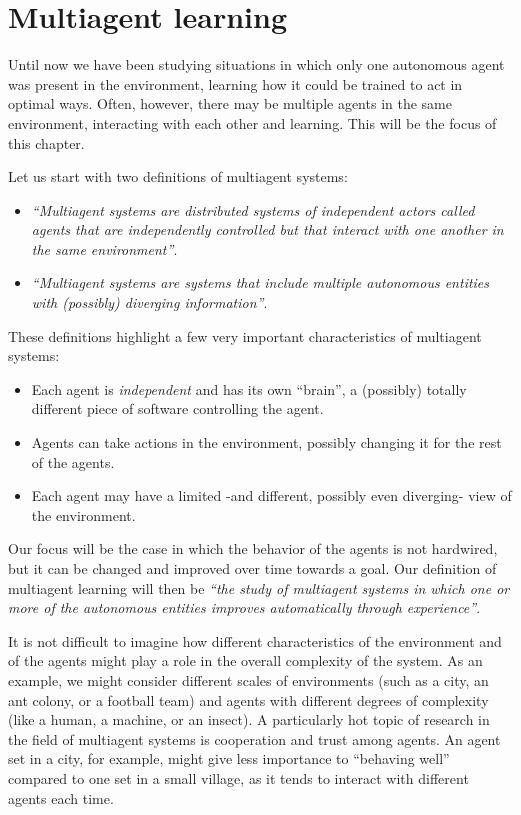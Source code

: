 \chapter{Multiagent learning}
Until now we have been studying situations in which only one autonomous agent was present in the environment, learning how it could be trained to act in optimal ways. Often, however, there may be multiple agents in the same environment, interacting with each other and learning. This will be the focus of this chapter.

Let us start with two definitions of multiagent systems:

\begin{itemize}
    \item \textit{``Multiagent systems are distributed systems of independent actors called agents that are independently controlled but that interact with one another in the same environment''}. \cite{wooldridge02} \cite{10.1007/978-3-030-01713-2_1}
    \item \textit{``Multiagent systems are systems that include multiple autonomous entities with (possibly) diverging information''}. \cite{ShohamLeytonBrown09}
\end{itemize}

These definitions highlight a few very important characteristics of multiagent systems:

\begin{itemize}
    \item Each agent is \textit{independent} and has its own ``brain'', a (possibly) totally different piece of software controlling the agent.
    \item Agents can take actions in the environment, possibly changing it for the rest of the agents.
    \item Each agent may have a limited -and different, possibly even diverging- view of the environment.
\end{itemize}

Our focus will be the case in which the behavior of the agents is not hardwired, but it can be changed and improved over time towards a goal. Our definition of multiagent learning will then be \textit{``the study of multiagent systems in which one or more of the autonomous entities improves automatically through experience''}.

It is not difficult to imagine how different characteristics of the environment and of the agents might play a role in the overall complexity of the system. As an example, we might consider different scales of environments (such as a city, an ant colony, or a football team) and agents with different degrees of complexity (like a human, a machine, or an insect). A particularly hot topic of research in the field of multiagent systems is cooperation and trust among agents. An agent set in a city, for example, might give less importance to ``behaving well'' compared to one set in a small village, as it tends to interact with different agents each time.

